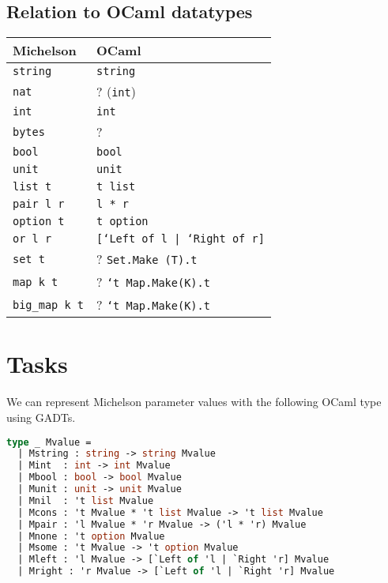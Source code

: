 \documentclass{article}
\begin{document}
\subsection{Relation to OCaml datatypes}
\label{sec:relat-ocaml-datatyp}

\begin{center}
  \begin{tabular}{|l|l|}
    Michelson & OCaml \\\hline
    \texttt{string}& \texttt{string}  \\
    \texttt{nat} & ? (\texttt{int}) \\
    \texttt{int} & \texttt{int} \\ 
    \texttt{bytes}& ? \\
    \texttt{bool}&\texttt{bool} \\
    \texttt{unit}&\texttt{unit} \\
    \texttt{list t}&\texttt{t list} \\
    \texttt{pair l r}&\texttt{l * r} \\
    \texttt{option t}     &\texttt{t option} \\
    \texttt{or l r}&\texttt{[`Left of l | `Right of r]} \\
    \texttt{set t}&? \texttt{Set.Make (T).t} \\
    \texttt{map k t}&? \texttt{`t Map.Make(K).t} \\
    \texttt{big\_map k t}&? \texttt{`t Map.Make(K).t} \\
    \hline
  \end{tabular}
\end{center}

\section{Tasks}
\label{sec:tasks}

We can represent Michelson parameter values with the following OCaml type using GADTs.
\begin{lstlisting}[language=Caml]
type _ Mvalue =
  | Mstring : string -> string Mvalue
  | Mint  : int -> int Mvalue
  | Mbool : bool -> bool Mvalue
  | Munit : unit -> unit Mvalue
  | Mnil  : 't list Mvalue
  | Mcons : 't Mvalue * 't list Mvalue -> 't list Mvalue
  | Mpair : 'l Mvalue * 'r Mvalue -> ('l * 'r) Mvalue
  | Mnone : 't option Mvalue
  | Msome : 't Mvalue -> 't option Mvalue
  | Mleft : 'l Mvalue -> [`Left of 'l | `Right 'r] Mvalue
  | Mright : 'r Mvalue -> [`Left of 'l | `Right 'r] Mvalue
\end{lstlisting}
\end{document}
